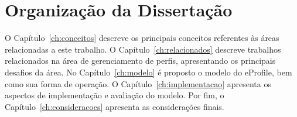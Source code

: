 \section{Organização da Dissertação}
\label{sec:organizacao}

O Capítulo~\ref{ch:conceitos} descreve os principais conceitos referentes às áreas relacionadas a este trabalho. O Capítulo~\ref{ch:relacionados} descreve trabalhos relacionados na área de gerenciamento de perfis, apresentando os principais desafios da área. No Capítulo~\ref{ch:modelo} é proposto o modelo do eProfile, bem como sua forma de operação. O Capítulo~\ref{ch:implementacao} apresenta os aspectos de implementação e avaliação do modelo. Por fim, o Capítulo~\ref{ch:consideracoes} apresenta as considerações finais.
